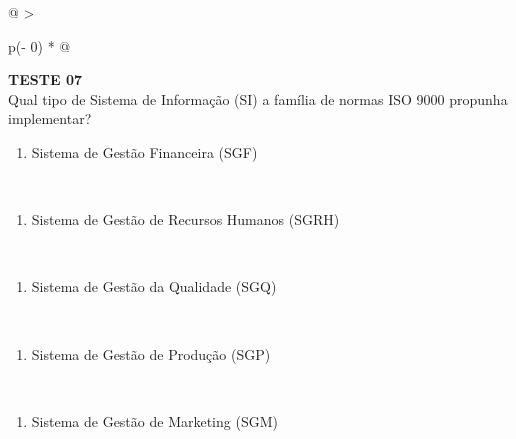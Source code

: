 \documentclass[
]{book}
\providecommand{\tightlist}{%
  \setlength{\itemsep}{0pt}\setlength{\parskip}{0pt}}
\begin{document}
\begin{longtable}[]{@{}
  >{\raggedright\arraybackslash}p{(\columnwidth - 0\tabcolsep) * }@{}}
\toprule\noalign{}
\endhead
\bottomrule\noalign{}
\endlastfoot
\textbf{TESTE 07} \\
Qual tipo de Sistema de Informação (SI) a família de normas ISO 9000 propunha implementar? \\
\begin{minipage}[t]{\linewidth}\raggedright
\begin{enumerate}
\def\labelenumi{\alph{enumi})}
\tightlist
\item
  Sistema de Gestão Financeira (SGF)
\end{enumerate}
\end{minipage} \\
\begin{minipage}[t]{\linewidth}\raggedright
\begin{enumerate}
\def\labelenumi{\alph{enumi})}
\setcounter{enumi}{1}
\tightlist
\item
  Sistema de Gestão de Recursos Humanos (SGRH)
\end{enumerate}
\end{minipage} \\
\begin{minipage}[t]{\linewidth}\raggedright
\begin{enumerate}
\def\labelenumi{\alph{enumi})}
\setcounter{enumi}{2}
\tightlist
\item
  Sistema de Gestão da Qualidade (SGQ)
\end{enumerate}
\end{minipage} \\
\begin{minipage}[t]{\linewidth}\raggedright
\begin{enumerate}
\def\labelenumi{\alph{enumi})}
\setcounter{enumi}{3}
\tightlist
\item
  Sistema de Gestão de Produção (SGP)
\end{enumerate}
\end{minipage} \\
\begin{minipage}[t]{\linewidth}\raggedright
\begin{enumerate}
\def\labelenumi{\alph{enumi})}
\setcounter{enumi}{4}
\tightlist
\item
  Sistema de Gestão de Marketing (SGM)
\end{enumerate}
\end{minipage} \\
\end{longtable}
\end{document}
